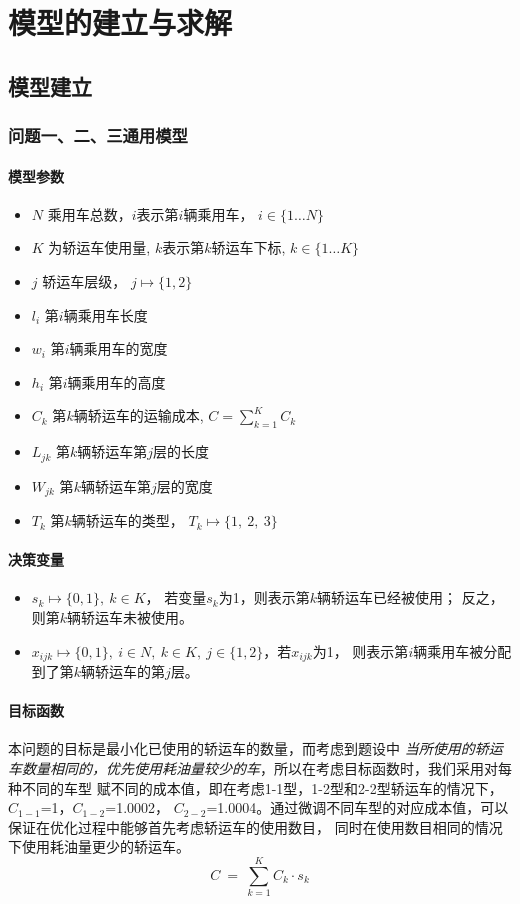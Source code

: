 \documentclass[UTF8]{ctexart}
\begin{document}
\section{模型的建立与求解}
\subsection{模型建立}
\subsubsection{问题一、二、三通用模型}
\label{sec:q123_model}

\paragraph{模型参数}
	\begin{itemize}
			\item $N$ 乘用车总数，$i$表示第$i$辆乘用车， $i \in \{1 \dots N\}$
			\item $K$ 为轿运车使用量, $k$表示第$k$轿运车下标,  $k \in \{1 \dots K\}$
			\item $j$ 轿运车层级， $j \mapsto \{1,2\}$
			\item $l_i$ 第$i$辆乘用车长度
			\item $w_i$ 第$i$辆乘用车的宽度
			\item $h_i$ 第$i$辆乘用车的高度
			\item $C_k$ 第$k$辆轿运车的运输成本, $C=\sum_{k=1}^{K}C_k$
			\item $L_{jk}$ 第$k$辆轿运车第$j$层的长度
			\item $W_{jk}$ 第$k$辆轿运车第$j$层的宽度
			\item $T_k$ 第$k$辆轿运车的类型， $T_k \mapsto \{1, ~2, ~3\}$	
		\end{itemize}
\paragraph{决策变量}
\label{sec:model1_devar}
\begin{itemize}
	\item $s_k \mapsto \{0,1\}, ~ k \in K$， 若变量$s_k$为1，则表示第$k$辆轿运车已经被使用；
	反之，则第$k$辆轿运车未被使用。
	\item $x_{ijk}\mapsto \{0,1\}, ~ i\in N,~ k \in K,~ j\in \{1,2\}$，若$x_{ijk}$为1，
	则表示第$i$辆乘用车被分配到了第$k$辆轿运车的第$j$层。
\end{itemize}

\paragraph{目标函数}
	本问题的目标是最小化已使用的轿运车的数量，而考虑到题设中
	\textit{当所使用的轿运车数量相同的，优先使用耗油量较少的车}，所以在考虑目标函数时，我们采用对每种不同的车型
	赋不同的成本值，即在考虑1-1型，1-2型和2-2型轿运车的情况下，$C_{1-1}$=1，$C_{1-2}$=1.0002，
	$C_{2-2}$=1.0004。通过微调不同车型的对应成本值，可以保证在优化过程中能够首先考虑轿运车的使用数目，
	同时在使用数目相同的情况下使用耗油量更少的轿运车。
	\begin{equation}
		C \ = \ \sum_{k=1}^{K}C_k \cdot s_k
	\end{equation}
\end{document}
